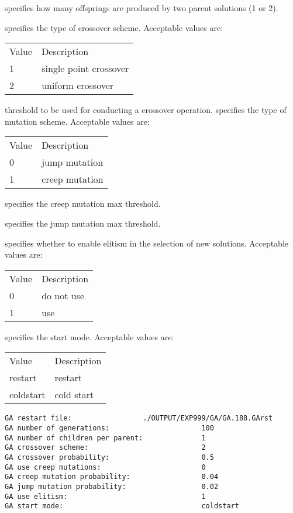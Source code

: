   specifies how many 
 offsprings are produced by two parent solutions (1 or 2).

  specifies the type of crossover
 scheme.
 Acceptable values are:

 \begin{tabular}{ll}
 Value & Description            \\
 1     & single point crossover \\
 2     & uniform crossover      \\
 \end{tabular}

  threshold to be used for 
 conducting a crossover operation.
  specifies the type of mutation
 scheme.
 Acceptable values are:

 \begin{tabular}{ll}
 Value & Description    \\
 0     & jump mutation  \\
 1     & creep mutation \\
 \end{tabular}

  specifies the 
 creep mutation max threshold.

  specifies the 
 jump mutation max threshold.

  specifies whether to enable
 elitism in the selection of new solutions.
 Acceptable values are:

 \begin{tabular}{ll}
 Value & Description \\
 0     & do not use  \\
 1     & use         \\
 \end{tabular}

  specifies the start mode.
 Acceptable values are:

 \begin{tabular}{ll}
 Value     & Description \\
 restart   & restart     \\
 coldstart & cold start  \\
 \end{tabular}
 

 \begin{Verbatim}[frame=single]
GA restart file:                 ./OUTPUT/EXP999/GA/GA.188.GArst
GA number of generations:                      100
GA number of children per parent:              1
GA crossover scheme:                           2
GA crossover probability:                      0.5
GA use creep mutations:                        0 
GA creep mutation probability:                 0.04
GA jump mutation probability:                  0.02
GA use elitism:                                1
GA start mode:                                 coldstart 
 \end{Verbatim}

